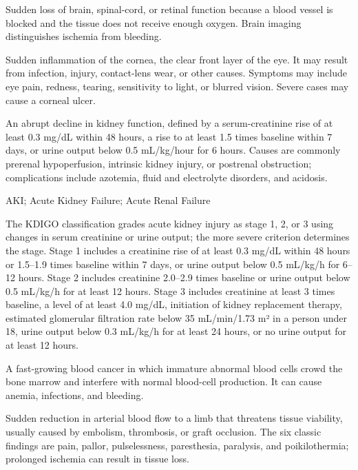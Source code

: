 Sudden loss of brain, spinal-cord, or retinal function because a blood vessel is blocked and the tissue does not receive enough oxygen. Brain imaging distinguishes ischemia from bleeding.

 Sudden inflammation of the cornea, the clear front layer of the eye.
It may result from infection, injury, contact-lens wear, or other causes. Symptoms
may include eye pain, redness, tearing, sensitivity to light, or blurred vision.
Severe cases may cause a corneal ulcer.

 An abrupt decline in kidney function, defined by a serum-creatinine rise of at least 0.3 mg/dL within 48 hours, a rise to at least 1.5 times baseline within 7 days, or urine output below 0.5 mL/kg/hour for 6 hours. Causes are commonly prerenal hypoperfusion, intrinsic kidney injury, or postrenal obstruction; complications include azotemia, fluid and electrolyte disorders, and acidosis.



\synonyms
AKI; Acute Kidney Failure; Acute Renal Failure

 The KDIGO classification grades acute kidney injury as stage 1, 2, or 3 using changes in serum creatinine or urine output; the more severe criterion determines the stage. Stage 1 includes a creatinine rise of at least 0.3 mg/dL within 48 hours or 1.5–1.9 times baseline within 7 days, or urine output below 0.5 mL/kg/h for 6–12 hours. Stage 2 includes creatinine 2.0–2.9 times baseline or urine output below 0.5 mL/kg/h for at least 12 hours. Stage 3 includes creatinine at least 3 times baseline, a level of at least 4.0 mg/dL, initiation of kidney replacement therapy, estimated glomerular filtration rate below 35 mL/min/1.73 m² in a person under 18, urine output below 0.3 mL/kg/h for at least 24 hours, or no urine output for at least 12 hours.

 A fast-growing blood cancer in which immature abnormal blood cells crowd the bone marrow and interfere with normal blood-cell production. It can cause anemia, infections, and bleeding.

 Sudden reduction in arterial blood flow to a limb that threatens tissue viability,
usually caused by embolism, thrombosis, or graft occlusion. The six classic findings are
pain, pallor, pulselessness, paresthesia, paralysis, and poikilothermia; prolonged ischemia
can result in tissue loss.

